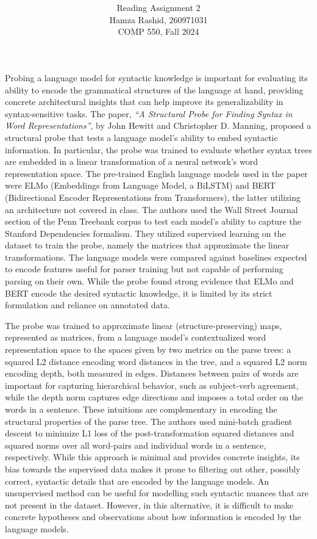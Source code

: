\documentclass[11pt]{article}
\title{ }
\author{ Reading Assignment 2 \\ Hamza Rashid, 260971031 \\ COMP 550, Fall 2024}
\date{}
\begin{document}
\maketitle

\vspace{-5ex}
Probing a language model for syntactic knowledge is important
for evaluating its ability to encode the grammatical structures of
the language at hand, providing concrete architectural insights 
that can help improve its generalizability in syntax-sensitive tasks.
The paper, \textit{``A Structural Probe for Finding 
Syntax in Word Representations''}, by John Hewitt and Christopher D. Manning,
proposed a structural probe that tests a
language model's ability to embed syntactic information. 
In particular,
the probe was trained to evaluate whether syntax trees are 
embedded in a linear transformation of a 
neural network’s word representation space.
The pre-trained English language models used in the paper were 
ELMo (Embeddings from Language Model, a BiLSTM) 
and BERT (Bidirectional Encoder Representations from Transformers), 
the latter utilizing an architecture not covered in class. 
The authors used 
the Wall Street Journal section of the 
Penn Treebank corpus to test each model's ability to capture
the Stanford Dependencies formalism. 
They utilized supervised learning on the dataset
to train the probe, namely the matrices that 
approximate the linear transformations.
The language models were compared against baselines 
expected to encode features useful for parser training 
but not capable of performing parsing on their own. 
While the probe found strong evidence
that ELMo and BERT encode the desired syntactic knowledge, 
it is limited by its strict formulation and reliance on annotated data.

The probe was trained to approximate
linear (structure-preserving) maps, represented as matrices,
from a language model's contextualized word representation space to 
the spaces given by two metrics on the parse trees: 
a squared L2 distance encoding 
word distances in the tree, and
a squared L2 norm encoding depth, 
both measured in edges. Distances between pairs of words
are important for capturing hierarchical behavior, such as subject-verb agreement,
while the depth norm captures edge directions and imposes a total order 
on the words in a sentence. These intuitions are complementary 
in encoding the structural properties of the parse tree.
The authors used mini-batch gradient descent 
to minimize L1 loss of the post-transformation squared distances and squared norms
over all word-pairs and individual words in a sentence, respectively.
While this approach is minimal and provides concrete insights,
its bias towards the supervised data makes it prone to filtering
out other, possibly correct, syntactic details that are
encoded by the language models.
An unsupervised method can be useful for modelling such syntactic nuances
that are not present in the dataset. However, in this alternative,
it is difficult to make concrete hypotheses and observations about how
information is encoded by the language models. 
\end{document}
